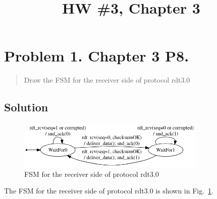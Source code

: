 \documentclass{cshwk}
\title{HW \#3, Chapter 3}
\begin{document}
\maketitle

\section*{Problem 1. Chapter 3 P8.}

\begin{quote}
    Draw the FSM for the receiver side of protocol rdt3.0
\end{quote}

\subsection*{Solution}

\begin{figure}[htbp]
    \centering
    \includegraphics[width=0.8\textwidth]{hw3-1-1.png}
    \caption{FSM for the receiver side of protocol rdt3.0}
    \label{fig:fsm-rdt3.0-receiver}
\end{figure}

The FSM for the receiver side of protocol rdt3.0 is shown in Fig.~\ref{fig:fsm-rdt3.0-receiver}.
\end{document}
